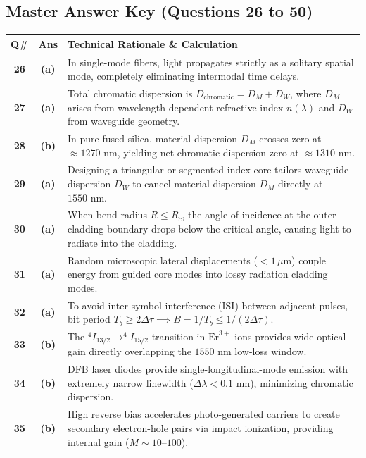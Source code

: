 \newpage

\subsection*{Master Answer Key (Questions 26 to 50)}

{\small
\noindent\begin{tabularx}{\textwidth}{|c|c|X|}
\hline
\textbf{Q\#} & \textbf{Ans} & \textbf{Technical Rationale \& Calculation} \\
\hline
\textbf{26} & \textbf{(a)} & In single-mode fibers, light propagates strictly as a solitary spatial mode, completely eliminating intermodal time delays. \\ \hline
\textbf{27} & \textbf{(a)} & Total chromatic dispersion is $D_{\text{chromatic}} = D_M + D_W$, where $D_M$ arises from wavelength-dependent refractive index $n(\lambda)$ and $D_W$ from waveguide geometry. \\ \hline
\textbf{28} & \textbf{(b)} & In pure fused silica, material dispersion $D_M$ crosses zero at $\approx 1270\text{ nm}$, yielding net chromatic dispersion zero at $\approx 1310\text{ nm}$. \\ \hline
\textbf{29} & \textbf{(a)} & Designing a triangular or segmented index core tailors waveguide dispersion $D_W$ to cancel material dispersion $D_M$ directly at $1550\text{ nm}$. \\ \hline
\textbf{30} & \textbf{(a)} & When bend radius $R \le R_c$, the angle of incidence at the outer cladding boundary drops below the critical angle, causing light to radiate into the cladding. \\ \hline
\textbf{31} & \textbf{(a)} & Random microscopic lateral displacements ($< 1\,\mu\text{m}$) couple energy from guided core modes into lossy radiation cladding modes. \\ \hline
\textbf{32} & \textbf{(a)} & To avoid inter-symbol interference (ISI) between adjacent pulses, bit period $T_b \ge 2\Delta\tau \implies B = 1/T_b \le 1/(2\Delta\tau)$. \\ \hline
\textbf{33} & \textbf{(b)} & The $^4I_{13/2} \to ^4I_{15/2}$ transition in $\text{Er}^{3+}$ ions provides wide optical gain directly overlapping the $1550\text{ nm}$ low-loss window. \\ \hline
\textbf{34} & \textbf{(b)} & DFB laser diodes provide single-longitudinal-mode emission with extremely narrow linewidth ($\Delta\lambda < 0.1\text{ nm}$), minimizing chromatic dispersion. \\ \hline
\textbf{35} & \textbf{(b)} & High reverse bias accelerates photo-generated carriers to create secondary electron-hole pairs via impact ionization, providing internal gain ($M \sim 10\text{--}100$). \\ \hline

\end{tabularx}}
